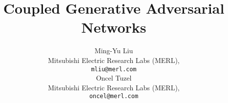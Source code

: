 \documentclass{article}
\title{Coupled Generative Adversarial Networks}
\author{
  Ming-Yu Liu\\
  Mitsubishi Electric Research Labs (MERL),\\
  \texttt{mliu@merl.com} \\
  \And
  Oncel Tuzel\\
  Mitsubishi Electric Research Labs (MERL),\\
  \texttt{oncel@merl.com} \\
}
\begin{document}

\maketitle






{
\small


}


\clearpage
\appendix





\end{document}
